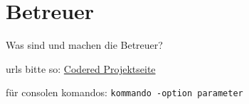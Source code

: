 \chapter{Betreuer}  %
\label{chapter:Betreuer}  %

Was sind und machen die Betreuer?

urls bitte so:
\href{http://codered.berlios.de}{Codered Projektseite}


für consolen komandos:
\verb|kommando -option parameter|

